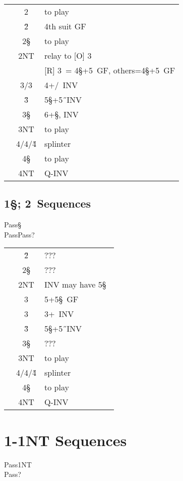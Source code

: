 \begin{longtable}{C{\linklength} C{\bidlength} l}
& 2\D & to play \\
& 2\H & 4th suit GF \\
& 2\S & to play \\
& 2NT & relay to [O] 3\C \\
&     & [R] 3\D\ = 4\S+5\D\ GF, others=4\S+5\C\ GF \\
& 3\C/3\D & 4+\C/\D\ INV \\
& 3\H & 5\S+5\H\ INV \\
& 3\S & 6+\S, INV \\
& 3NT & to play \\
& 4\C/4\D/4\H & splinter \\
& 4\S & to play \\
& 4NT & Q-INV \\
\end{longtable}

\subsection{1\S; 2\D\ Sequences}

\begin{bidding}
\>\D\>Pass\S\\
\>Pass\D\>Pass\>?\\
\end{bidding}

\begin{longtable}{C{\linklength} C{\bidlength} l}
& 2\H & ??? \\
& 2\S & ??? \\
& 2NT & INV may have 5\S\ \\
& 3\C & 5\C+5\S\ GF \\
& 3\C & 3+\D\ INV \\
& 3\H & 5\S+5\H\ INV \\
& 3\S & ??? \\
& 3NT & to play \\
& 4\C/4\D/4\H & splinter \\
& 4\S & to play \\
& 4NT & Q-INV \\
\end{longtable}

\hypertarget{1d1n}{}
\section{1\D-1NT Sequences}

\begin{bidding}
\>\D\>Pass\>1NT\\
\>Pass\>?\\
\end{bidding}

